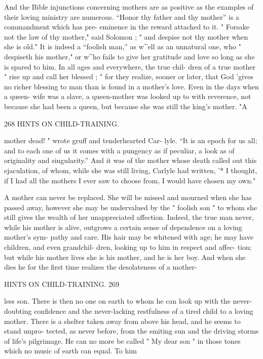 \documentclass[
]{book}
\begin{document}
And the Bible injunctions concerning mothers are as positive as the examples of their loving ministry are numerous. ``Honor thy father and thy mother'' is a commandment which has pre- eminence in the reward attached to it. " Forsake not the law of thy mother," said Solomon ; " and despise not thy mother when she is old." It is indeed a ``foolish man,'' as w\^{}ell as an unnatural one, who " despiseth his mother," or w\^{}ho fails to give her gratitude and love so long as she is spared to him. In all ages and everywhere, the true chil- dren of a true mother " rise up and call her blessed ; " for they realize, sooner or later, that God 'gives no richer blessing to man than is found in a mother's love. Even in the days when a queen- wife was a slave, a queen-mother was looked up to with reverence, not because she had been a queen, but because she was still the king's mother. "A

268 HINTS ON CHILD-TRAINING.

mother dead! " wrote gruff and tenderhearted Car- lyle. ``It is an epoch for us all; and to each one of us it comes with a pungency as if peculiar, a look as of originality and singularity.'' And it was of the mother whose death called out this ejaculation, of whom, while she was still living, Carlyle had written, '* I thought, if I had all the mothers I ever saw to choose from, I would have chosen my own."

A mother can never be replaced. She will be missed and mourned when she has passed away, however she may be undervalued by the " foolish son " to whom she still gives the wealth of her unappreciated affection. Indeed, the true man never, while his mother is alive, outgrows a certain sense of dependence on a loving mother's sym- pathy and care. His hair may be whitened with age; he may have children, and even grandchil- dren, looking up to him in respect and affec- tion; but while his mother lives she is his mother, and he is her boy. And when she dies he for the first time realizes the desolateness of a mother-

HINTS ON CHILD-TRAINING. 269

less son. There is then no one on earth to whom he can look up with the never-doubting confidence and the never-lacking restfulness of a tired child to a loving mother. There is a shelter taken away from above his head, and he seems to stand unpro- tected, as never before, from the smiting sun and the driving storms of life's pilgrimage. He can no more be called " My dear son " in those tones which no music of earth can equal. To him
\end{document}
